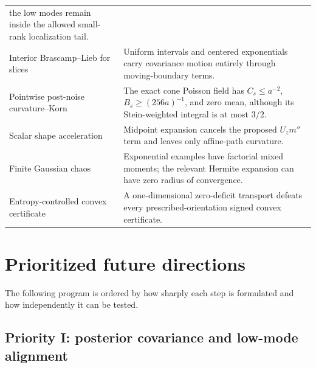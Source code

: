 \documentclass[11pt]{article}
\theoremstyle{definition}
\theoremstyle{remark}
\newcommand{\1}{\mathbf 1}
\begin{document}
\begin{longtable}{>{\raggedright\arraybackslash}p{}
                  >{\raggedright\arraybackslash}p{}}
the low modes remain inside the allowed small-rank localization tail. \\
\addlinespace
Interior Brascamp--Lieb for slices & Uniform intervals and centered
exponentials carry covariance motion entirely through moving-boundary
terms. \\
\addlinespace
Pointwise post-noise curvature--Korn & The exact cone Poisson field has
\(C_s\le a^{-2}\), \(B_s\ge(256a)^{-1}\), and zero mean, although its
Stein-weighted integral is at most \(3/2\). \\
\addlinespace
Scalar shape acceleration & Midpoint expansion cancels the proposed
\(U_zm''\) term and leaves only affine-path curvature. \\
\addlinespace
Finite Gaussian chaos & Exponential examples have factorial mixed moments;
the relevant Hermite expansion can have zero radius of convergence. \\
\addlinespace
Entropy-controlled convex certificate & A one-dimensional zero-deficit
transport defeats every prescribed-orientation signed convex certificate. \\
\bottomrule
\end{longtable}

\section{Prioritized future directions}

The following program is ordered by how sharply each step is formulated
and how independently it can be tested.

\subsection{Priority I: posterior covariance and low-mode alignment}
\end{document}
